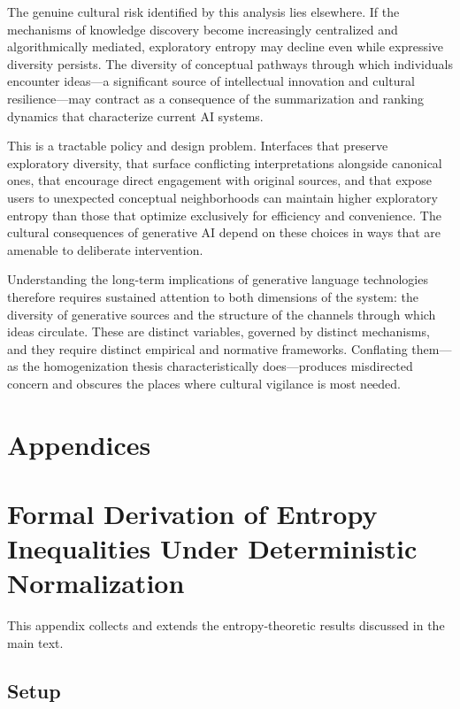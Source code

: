 \documentclass[12pt,a4paper]{article}
\theoremstyle{definition}
\theoremstyle{plain}
\theoremstyle{remark}
\begin{document}
The genuine cultural risk identified by this analysis lies elsewhere. If the mechanisms of
knowledge discovery become increasingly centralized and algorithmically mediated, exploratory
entropy may decline even while expressive diversity persists. The diversity of conceptual
pathways through which individuals encounter ideas---a significant source of intellectual
innovation and cultural resilience---may contract as a consequence of the summarization and
ranking dynamics that characterize current AI systems.

This is a tractable policy and design problem. Interfaces that preserve exploratory diversity,
that surface conflicting interpretations alongside canonical ones, that encourage direct
engagement with original sources, and that expose users to unexpected conceptual neighborhoods
can maintain higher exploratory entropy than those that optimize exclusively for efficiency
and convenience. The cultural consequences of generative AI depend on these choices in ways
that are amenable to deliberate intervention.

Understanding the long-term implications of generative language technologies therefore
requires sustained attention to both dimensions of the system: the diversity of generative
sources and the structure of the channels through which ideas circulate. These are distinct
variables, governed by distinct mechanisms, and they require distinct empirical and normative
frameworks. Conflating them---as the homogenization thesis characteristically does---produces
misdirected concern and obscures the places where cultural vigilance is most needed.

\newpage
\section*{Appendices}
\appendix

\section{Formal Derivation of Entropy Inequalities Under Deterministic Normalization}
\label{app:entropy}

This appendix collects and extends the entropy-theoretic results discussed in the main text.

\subsection{Setup}
\end{document}
